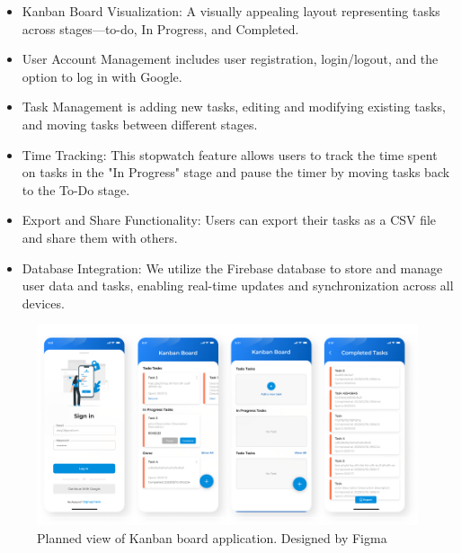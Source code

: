 \begin{itemize}
\item	Kanban Board Visualization: A visually appealing layout representing tasks across stages—to-do, In Progress, and Completed.
\item	User Account Management includes user registration, login/logout, and the option to log in with Google.  
\item  	Task Management is adding new tasks, editing and modifying existing tasks, and moving tasks between different stages.
\item 	Time Tracking: This stopwatch feature allows users to track the time spent on tasks in the "In Progress" stage and pause the timer by moving tasks back to the To-Do stage.
\item 	Export and Share Functionality: Users can export their tasks as a CSV file and share them with others.
\item   Database Integration: We utilize the Firebase database to store and manage user data and tasks, enabling real-time updates and synchronization across all devices.
\end{itemize}

\begin{figure}[htbp]
    \centering
    \includegraphics[scale = 0.85]{img/kanban_board.png}
    \caption{Planned view of Kanban board application. Designed by Figma}
    \label{fig:kanban_board}
\end{figure}

